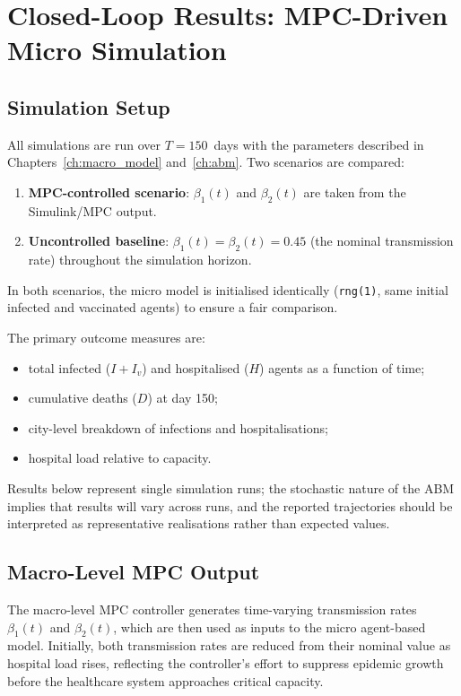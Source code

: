 

\chapter{Closed-Loop Results: MPC-Driven Micro Simulation}
\label{ch:closed_loop}

\section{Simulation Setup}
\label{sec:cl_setup}

All simulations are run over $T = 150$~days with the parameters described in Chapters~\ref{ch:macro_model} and~\ref{ch:abm}.
Two scenarios are compared:
\begin{enumerate}
  \item \textbf{MPC-controlled scenario}: $\beta_1(t)$ and $\beta_2(t)$ are taken from the Simulink/MPC output.
  \item \textbf{Uncontrolled baseline}: $\beta_1(t) = \beta_2(t) = 0.45$ (the nominal transmission rate) throughout the simulation horizon.
\end{enumerate}
In both scenarios, the micro model is initialised identically (\texttt{rng(1)}, same initial infected and vaccinated agents) to ensure a fair comparison.

The primary outcome measures are:
\begin{itemize}
  \item total infected ($I + I_v$) and hospitalised ($H$) agents as a function of time;
  \item cumulative deaths ($D$) at day 150;
  \item city-level breakdown of infections and hospitalisations;
  \item hospital load relative to capacity.
\end{itemize}
Results below represent single simulation runs; the stochastic nature of the ABM implies that results will vary across runs, and the reported trajectories should be interpreted as representative realisations rather than expected values.

\section{Macro-Level MPC Output}
\label{sec:mpc_output}

The macro-level MPC controller generates time-varying transmission rates $\beta_1(t)$ and $\beta_2(t)$, which are then used as inputs to the micro agent-based model.
Initially, both transmission rates are reduced from their nominal value as hospital load rises, reflecting the controller's effort to suppress epidemic growth before the healthcare system approaches critical capacity.


